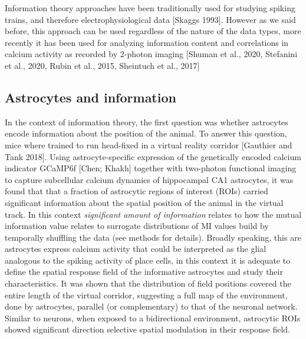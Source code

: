 Information theory approaches have been traditionally used for studying spiking trains, and therefore electrophysiological data [Skaggs 1993].
However as we said before, this approach can be used regardless of the nature of the data types, more recently it has been used for analyzing information content and correlations in calcium activity as recorded by 2-photon imaging [Shuman et al., 2020, Stefanini et al., 2020, Rubin et al., 2015, Sheintuch et al., 2017] 
\subsection{Astrocytes and information}
\label{chap1:sec:3:subsec1:astro_info}
In the context of information theory, the first question was whether astrocytes encode information about the position of the animal.
To answer this question, mice where trained to run head-fixed in a virtual reality corridor [Gauthier and Tank 2018].
Using astrocyte-specific expression of the genetically encoded calcium indicator GCaMP6f [Chen; Khakh] together with two-photon functional imaging to capture subcellular calcium dynamics of hippocampal CA1 astrocytes, it was found that that a fraction of astrocytic regions of interest (ROIs) carried significant information about the spatial position of the animal in the virtual track.
In this context \textit{significant amount of information} relates to how the mutual information value relates to surrogate distributions of MI values build by temporally shuffling the data (see methods for details). 
Broadly speaking, this are astrocytes express calcium activity that could be interpreted as the glial analogous to the spiking activity of place cells, in this context it is adequate to define the spatial response field of the informative astrocytes and study their characteristics.
It was shown that the distribution of field positions covered the entire length of the virtual corridor, suggesting a full map of the environment, done by astrocytes, parallel (or complementary) to that of the neuronal network.
Similar to neurons, when exposed to a bidirectional environment, astrocytic ROIs showed significant direction selective spatial modulation in their response field.

